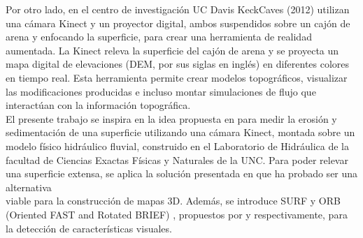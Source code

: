 Por otro lado, en el centro de investigación UC Davis KeckCaves (2012) \cite{arsandbox} utilizan una cámara Kinect y un proyector digital, ambos suspendidos sobre un cajón de arena y enfocando la superficie, para crear una herramienta de realidad aumentada. La Kinect releva la superficie del cajón de arena y se proyecta un mapa digital de elevaciones (DEM, por sus siglas en inglés) en diferentes colores en tiempo real. Esta herramienta permite crear modelos topográficos, visualizar las modificaciones producidas e incluso montar simulaciones de flujo que interactúan con la información topográfica. \\
El presente trabajo se inspira en la idea propuesta en  \cite{arsandbox} para medir la erosión y sedimentación de una superficie utilizando una cámara Kinect, montada sobre un modelo físico hidráulico fluvial, construido en el Laboratorio de Hidráulica de la facultad de Ciencias Exactas Físicas y Naturales de la UNC. Para poder relevar una superficie extensa, se aplica la solución presentada en  \cite{henry2010rgb} que ha probado ser una alternativa \\viable para la construcción de mapas 3D. Además, se introduce SURF y ORB (Oriented FAST and Rotated BRIEF) \cite{RubleeRKB11}, propuestos por \cite{engelhard2011real} y \cite{fioraio2011realtime} respectivamente, para la detección de características visuales.